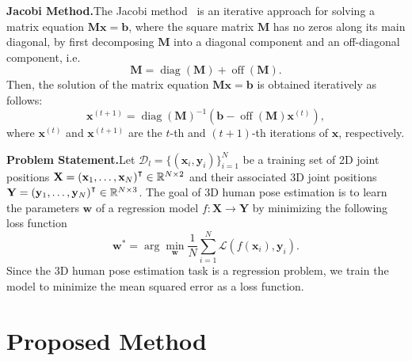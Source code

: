 \documentclass{bmvc2k}
\newcommand{\op}[1]{\operatorname{#1}}
\newcommand\T{{\mathpalette\raiseT\intercal}}
\newcommand\raiseT[2]{\setbox0\hbox{$#1{#2}$}\raise\dp0\box0}
\begin{document}
\medskip\noindent\textbf{Jacobi Method.}\quad The Jacobi method~\cite{Saad:03} is an iterative approach for solving a matrix equation $\bm{M}\bm{x}=\bm{b}$, where the square matrix $\bm{M}$ has no zeros along its main diagonal, by first decomposing $\bm{M}$ into a diagonal component and an off-diagonal component, i.e.
\begin{equation}
\bm{M}=\op{diag}(\bm{M})+\op{off}(\bm{M}).
\end{equation}
Then, the solution of the matrix equation $\bm{M}\bm{x}=\bm{b}$ is obtained iteratively as follows:
\begin{equation}
\bm{x}^{(t+1)} = \op{diag}(\bm{M})^{-1}(\bm{b}-\op{off}(\bm{M})\bm{x}^{(t)}),
\end{equation}
where $\bm{x}^{(t)}$ and $\bm{x}^{(t+1)}$ are the $t$-th and $(t+1)$-th iterations of $\bm{x}$, respectively.

\medskip\noindent\textbf{Problem Statement.}\quad Let $\mathcal{D}_{l}=\{(\bm{x}_{i},\bm{y}_{i})\}_{i=1}^{N}$ be a training set of 2D joint positions $\bm{X}=(\bm{x}_{1},\dots,\bm{x}_{N})^{\T}\in\mathbb{R}^{N\times 2}$ and their associated 3D joint positions $\bm{Y}=(\bm{y}_{1},\dots,\bm{y}_{N})^{\T}\in\mathbb{R}^{N\times 3}$. The goal of 3D human pose estimation is to learn the parameters $\bm{w}$ of a regression model $f: \bm{X}\to\bm{Y}$ by minimizing the following loss function
\begin{equation}
\bm{w}^{*}=\arg\min_{\bm{w}}\frac{1}{N}\sum_{i=1}^{N}\mathcal{L}(f(\bm{x}_{i}),\bm{y}_{i}).
\end{equation}
Since the 3D human pose estimation task is a regression problem, we train the model to minimize the mean squared error as a loss function.

\section{Proposed Method}
\end{document}
